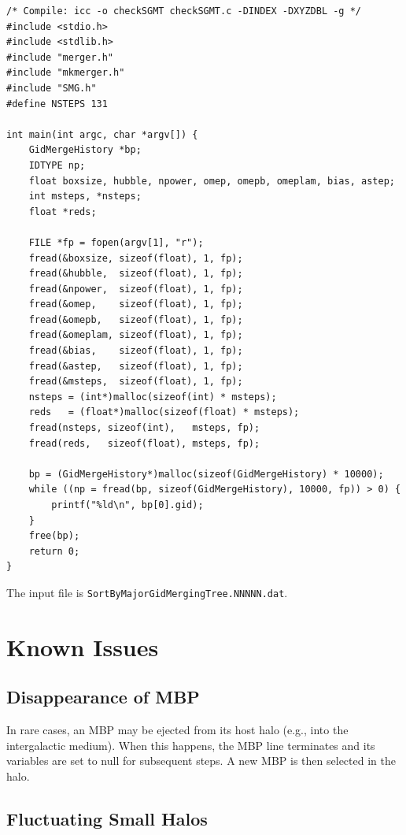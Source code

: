\documentclass[11pt,fleqn]{book}
\newcommand{\file}[1]{\texttt{#1}}
\begin{document}
\begin{example}
\begin{lstlisting}[style=ccode]
/* Compile: icc -o checkSGMT checkSGMT.c -DINDEX -DXYZDBL -g */
#include <stdio.h>
#include <stdlib.h>
#include "merger.h"
#include "mkmerger.h"
#include "SMG.h"
#define NSTEPS 131

int main(int argc, char *argv[]) {
    GidMergeHistory *bp;
    IDTYPE np;
    float boxsize, hubble, npower, omep, omepb, omeplam, bias, astep;
    int msteps, *nsteps;
    float *reds;

    FILE *fp = fopen(argv[1], "r");
    fread(&boxsize, sizeof(float), 1, fp);
    fread(&hubble,  sizeof(float), 1, fp);
    fread(&npower,  sizeof(float), 1, fp);
    fread(&omep,    sizeof(float), 1, fp);
    fread(&omepb,   sizeof(float), 1, fp);
    fread(&omeplam, sizeof(float), 1, fp);
    fread(&bias,    sizeof(float), 1, fp);
    fread(&astep,   sizeof(float), 1, fp);
    fread(&msteps,  sizeof(float), 1, fp);
    nsteps = (int*)malloc(sizeof(int) * msteps);
    reds   = (float*)malloc(sizeof(float) * msteps);
    fread(nsteps, sizeof(int),   msteps, fp);
    fread(reds,   sizeof(float), msteps, fp);

    bp = (GidMergeHistory*)malloc(sizeof(GidMergeHistory) * 10000);
    while ((np = fread(bp, sizeof(GidMergeHistory), 10000, fp)) > 0) {
        printf("%ld\n", bp[0].gid);
    }
    free(bp);
    return 0;
}
\end{lstlisting}
The input file is \file{SortByMajorGidMergingTree.NNNNN.dat}.
\end{example}

\section{Known Issues}

\subsection{Disappearance of MBP}

In rare cases, an MBP may be ejected from its host halo (e.g., into the intergalactic medium).  When this happens, the MBP line terminates and its variables are set to null for subsequent steps.  A new MBP is then selected in the halo.

\subsection{Fluctuating Small Halos}
\end{document}
